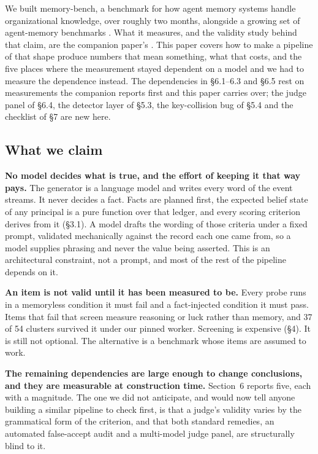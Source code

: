 \documentclass[11pt]{article}
\begin{document}
We built memory-bench, a benchmark for how agent memory systems handle
organizational knowledge, over roughly two months, alongside a growing set of
agent-memory benchmarks \cite{locomo, memtrack, memoryarena, gatemem}. What it
measures, and the validity study behind that claim, are the companion paper's
\cite{companion}. This paper covers how to make a pipeline of that shape
produce numbers that mean something, what that costs, and the five places
where the measurement stayed dependent on a model and we had to measure the
dependence instead. The dependencies in \S6.1--6.3 and \S6.5 rest on
measurements the companion reports first and this paper carries over; the
judge panel of \S6.4, the detector layer of \S5.3, the key-collision bug of
\S5.4 and the checklist of \S7 are new here.

\subsection{What we claim}

\textbf{No model decides what is true, and the effort of keeping it that way
pays.} The generator is a language model and writes every word of the event
streams. It never decides a fact. Facts are planned first, the expected belief
state of any principal is a pure function over that ledger, and every scoring
criterion derives from it (\S3.1). A model drafts the wording of those criteria
under a fixed prompt, validated mechanically against the record each one came
from, so a model supplies phrasing and never the value being asserted. This is an
architectural constraint, not a prompt, and most of the rest of the pipeline
depends on it.

\textbf{An item is not valid until it has been measured to be.} Every probe
runs in a memoryless condition it must fail and a fact-injected condition it
must pass. Items that fail that screen measure reasoning or luck rather than
memory, and 37 of 54 clusters survived it under our pinned worker.
Screening is expensive (\S4). It is still not optional. The alternative
is a benchmark whose items are assumed to work.

\textbf{The remaining dependencies are large enough to change conclusions, and
they are measurable at construction time.} Section~6 reports five, each with a
magnitude. The one we did not anticipate, and would now tell anyone building a
similar pipeline to check first, is that a judge's validity varies by the
grammatical form of the criterion, and that both standard remedies, an
automated false-accept audit and a multi-model judge panel, are structurally
blind to it.
\end{document}
